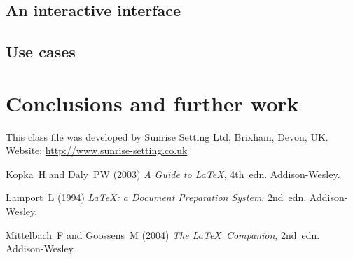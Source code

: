 \documentclass[Afour,sageh,times]{sagej}
\begin{document}
\subsection{An interactive interface}
\subsection{Use cases}

\section{Conclusions and further work}
\begin{acks}
This class file was developed by Sunrise Setting Ltd,
Brixham, Devon, UK.\\
Website: \url{http://www.sunrise-setting.co.uk}
\end{acks}

\begin{thebibliography}{99}
Kopka~H and Daly~PW (2003) \textit{A Guide to \LaTeX}, 4th~edn.
Addison-Wesley.

Lamport~L (1994) \textit{\LaTeX: a Document Preparation System},
2nd~edn. Addison-Wesley.

Mittelbach~F and Goossens~M (2004) \textit{The \LaTeX\ Companion},
2nd~edn. Addison-Wesley.

\end{thebibliography}
\end{document}
